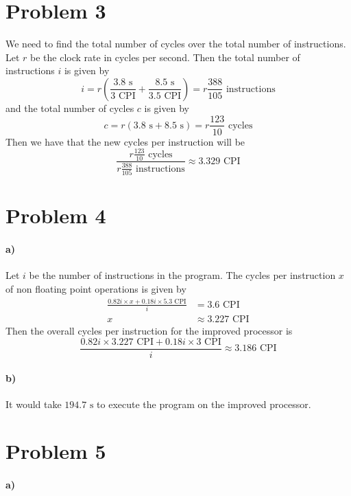 \documentclass[12pt]{article}
\begin{document}
\section*{Problem 3}

We need to find the total number of cycles over the total number of instructions.
Let \(r\) be the clock rate in cycles per second. Then the total number of instructions \(i\) is given by
\[i=r\left(\frac{3.8\text{ s}}{3\text{ CPI}}+\frac{8.5\text{ s}}{3.5\text{ CPI}}\right)=r\frac{388}{105}\text{ instructions}\]
and the total number of cycles \(c\) is given by
\[c=r(3.8\text{ s}+8.5\text{ s})=r\frac{123}{10}\text{ cycles}\]
Then we have that the new cycles per instruction will be
\[\frac{r\frac{123}{10}\text{ cycles}}{r\frac{388}{105}\text{ instructions}}\approx 3.329 \text{ CPI}\]

\section*{Problem 4}

\paragraph{a)}

Let \(i\) be the number of instructions in the program. The cycles per instruction \(x\) of non floating point operations is given by
\begin{align*}
        \frac{0.82i\times x+0.18i\times 5.3\text{ CPI}}{i}&=3.6\text{ CPI}\\
        x&\approx 3.227 \text{ CPI}
\end{align*}
Then the overall cycles per instruction for the improved processor is
\[\frac{0.82i\times 3.227\text{ CPI}+0.18i\times 3\text{ CPI}}{i} \approx 3.186\text{ CPI}\]

\paragraph{b)}

It would take \(194.7\text{ s}\) to execute the program on the improved processor.

\section*{Problem 5}

\paragraph{a)}
\end{document}
